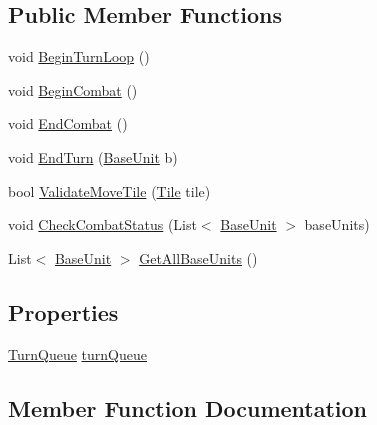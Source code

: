\subsection*{Public Member Functions}
\begin{DoxyCompactItemize}
\item 
void \mbox{\hyperlink{class_combat_manager_aa31394843beacdbfd52d683a68a7f454}{Begin\+Turn\+Loop}} ()
\item 
void \mbox{\hyperlink{class_combat_manager_ab5d0c356fd55e86d62b03c015754abee}{Begin\+Combat}} ()
\item 
void \mbox{\hyperlink{class_combat_manager_a8d14cf9a8265e20264151a615e309f12}{End\+Combat}} ()
\item 
void \mbox{\hyperlink{class_combat_manager_ae306deb3898e096bf5ad6cdd705b82fa}{End\+Turn}} (\mbox{\hyperlink{class_base_unit}{Base\+Unit}} b)
\item 
bool \mbox{\hyperlink{class_combat_manager_a6f648795292255b600e92eefcf960ded}{Validate\+Move\+Tile}} (\mbox{\hyperlink{class_tile}{Tile}} tile)
\item 
void \mbox{\hyperlink{class_combat_manager_aea6dfda807c4ec793ed26c5d220b84fb}{Check\+Combat\+Status}} (List$<$ \mbox{\hyperlink{class_base_unit}{Base\+Unit}} $>$ base\+Units)
\item 
List$<$ \mbox{\hyperlink{class_base_unit}{Base\+Unit}} $>$ \mbox{\hyperlink{class_combat_manager_a02eb44e3f4fab4f210d4ecda54fa1272}{Get\+All\+Base\+Units}} ()
\end{DoxyCompactItemize}
\subsection*{Properties}
\begin{DoxyCompactItemize}
\item 
\mbox{\hyperlink{class_turn_queue}{Turn\+Queue}} \mbox{\hyperlink{class_combat_manager_a6316ac49fbaf2e16426313d12749761d}{turn\+Queue}}
\end{DoxyCompactItemize}


\subsection{Member Function Documentation}
\mbox{\label{class_combat_manager_ab5d0c356fd55e86d62b03c015754abee}} 
